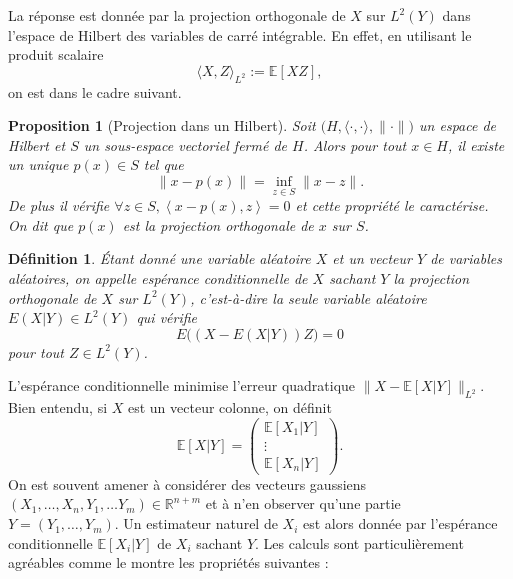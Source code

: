 \documentclass[a4paper,12pt]{book}
\newtheorem{defnfr}[thmfr]{Définition}
\newtheorem{propfr}[thmfr]{Proposition}
\begin{document}
La réponse est donnée par la projection orthogonale de $X$ sur $L^2(Y)$ dans l'espace de Hilbert des variables de carré intégrable. En effet, en utilisant le produit scalaire
$$\langle X,Z\rangle_{L^2}:=\mathbb{E}[XZ],$$
on est dans le cadre suivant.
\begin{propfr}[Projection dans un Hilbert] Soit $\big(H,\langle\cdot,\cdot\rangle,\|\cdot\|\big)$ un espace de Hilbert et $S$ un sous-espace vectoriel ferm\'e de $H$. Alors pour tout $x \in H$,  il existe un unique $p(x) \in S$ tel que $$\|x-p(x)\|=\inf_{z \in S}\|x-z\|.$$ De plus il v\'erifie $\forall z \in S, \left\langle x-p(x),z\right\rangle=0$ et cette propri\'et\'e le caract\'erise. On dit que $p(x)$ est la projection orthogonale de
$x$ sur $S$.
\end{propfr}

\begin{defnfr}\'Etant donné une variable aléatoire $X$ et un vecteur $Y$ de variables aléatoires, on appelle espérance conditionnelle de $X$ sachant $Y$ la projection orthogonale de $X$ sur $L^2(Y)$, c'est-à-dire la seule variable aléatoire $E(X|Y)\in L^2(Y)$ qui vérifie
 $$E\big((X-E(X|Y))Z\big)=0$$
 pour tout $Z\in L^2(Y)$.
\end{defnfr}
L'espérance conditionnelle minimise l'erreur quadratique $\|X-\mathbb{E}[X|Y]\|_{L^2}$. Bien entendu, si $X$ est un vecteur colonne, on définit
$$\mathbb{E}[X|Y]=\left(\begin{array}{c}
\mathbb{E}[X_1|Y] \\
\vdots\\
\mathbb{E}[X_n|Y]
\end{array} \right).$$
On est souvent amener à considérer des vecteurs gaussiens $(X_1,\ldots,X_n,Y_1,\ldots Y_m)\in \mathbb{R}^{n+m}$ et à n'en observer qu'une partie $Y=(Y_1,\ldots,Y_m)$. Un estimateur naturel de $X_i$ est alors donnée par l'espérance conditionnelle $\mathbb{E}[X_i|Y]$ de $X_i$ sachant $Y$. Les calculs sont particulièrement agréables comme le montre les propriétés suivantes :
\end{document}
